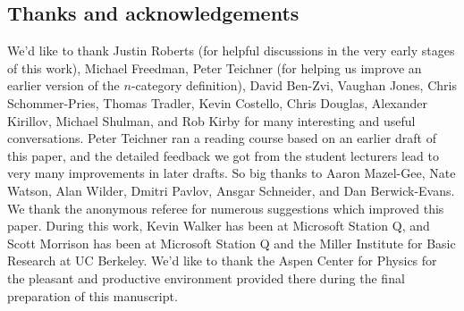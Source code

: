 \subsection{Thanks and acknowledgements}
We'd like to thank 
Justin Roberts (for helpful discussions in the very early stages of this work), 
Michael Freedman, 
Peter Teichner (for helping us improve an earlier version of the $n$-category definition), 
David Ben-Zvi, 
Vaughan Jones, 
Chris Schommer-Pries, 
Thomas Tradler,
Kevin Costello, 
Chris Douglas,
Alexander Kirillov,
Michael Shulman,
and
Rob Kirby
for many interesting and useful conversations. 
Peter Teichner ran a reading course based on an earlier draft of this paper, and the detailed feedback
we got from the student lecturers lead to very many improvements in later drafts.
So big thanks to
Aaron Mazel-Gee,
Nate Watson,
Alan Wilder,
Dmitri Pavlov,
Ansgar Schneider,
and
Dan Berwick-Evans.
We thank the anonymous referee for numerous suggestions which improved this paper.
During this work, Kevin Walker has been at Microsoft Station Q, and Scott Morrison has been at 
Microsoft Station Q and the Miller Institute for Basic Research at UC Berkeley. 
We'd like to thank the Aspen Center for Physics for the pleasant and productive 
environment provided there during the final preparation of this manuscript.

